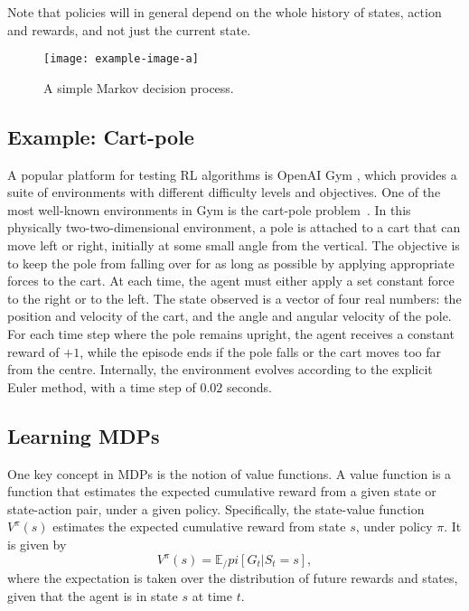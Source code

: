 Note that policies will in general depend on the whole history of states, action and rewards, and not just the current state.

\begin{figure}
    \centering
    \texttt{[image: example-image-a]}

    \caption{A simple Markov decision process.}
    \label{fig:mdp}
\end{figure}


\subsection{Example: Cart-pole}
A popular platform for testing RL algorithms is OpenAI Gym \autocite{gym}, which provides a suite of environments with different difficulty levels and objectives.
One of the most well-known environments in Gym is the cart-pole problem~\autocite{barto1983}.
In this physically two-two-dimensional environment, a pole is attached to a cart that can move left or right, initially at some small angle from the vertical.
The objective is to keep the pole from falling over for as long as possible by applying appropriate forces to the cart.
At each time, the agent must either apply a set constant force to the right or to the left.
The state observed is a vector of four real numbers: the position and velocity of the cart, and the angle and angular velocity of the pole.
For each time step where the pole remains upright, the agent receives a constant reward of $+1$, while the episode ends if the pole falls or the cart moves too far from the centre.
Internally, the environment evolves according to the explicit Euler method, with a time step of $0.02$ seconds\footnotemark.



\subsection{Learning MDPs}
One key concept in MDPs is the notion of value functions.
A value function is a function that estimates the expected cumulative reward from a given state or state-action pair, under a given policy.
Specifically, the state-value function $V^{\pi}(s)$ estimates the expected cumulative reward from state $s$, under policy $\pi$.
It is given by
\begin{equation}
    V^{\pi}(s) = \mathbb{E}_/pi \left[ G_t | S_t = s \right],
\end{equation}
where the expectation is taken over the distribution of future rewards and states, given that the agent is in state $s$ at time $t$.

